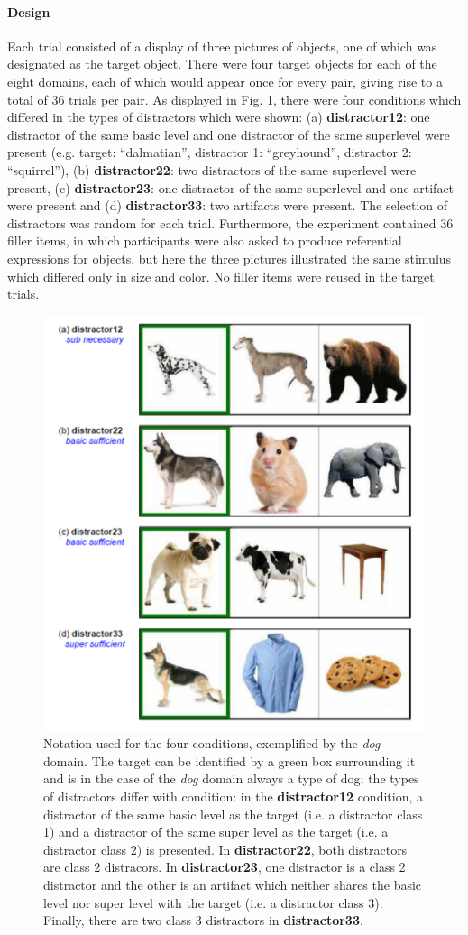 \documentclass[10pt,letterpaper]{article}
\begin{document}
\paragraph{\bf Design}
Each trial consisted of a display of three pictures of objects, one of which was designated as the target object. There were four target objects for each of the eight domains, each of which would appear once for every pair, giving rise to a total of 36 trials per pair. As displayed in Fig. 1, there were four conditions which differed in the types of distractors which were shown: (a) \textbf{distractor12}: one distractor of the same basic level and one distractor of the same superlevel were present (e.g. target: ``dalmatian'', distractor 1: ``greyhound'', distractor 2: ``squirrel''), (b) \textbf{distractor22}: two distractors of the same superlevel were present, (c) \textbf{distractor23}: one distractor of the same superlevel and one artifact were present and (d) \textbf{distractor33}: two artifacts were present. The selection of distractors was random for each trial. Furthermore, the experiment contained 36 filler items, in which participants were also asked to produce referential expressions for objects, but here the three pictures illustrated the same stimulus which differed only in size and color. No filler items were reused in the target trials.

\begin{figure}[ht!]
\centering
\includegraphics[width=.5\textwidth]{graphs/design}
\caption{Notation used for the four conditions, exemplified by the \textit{dog} domain. The target can be identified by a green box surrounding it and is in the case of the \textit{dog} domain always a type of dog; the types of distractors differ with condition: in the  \textbf{distractor12} condition, a distractor of the same basic level as the target (i.e. a distractor class 1) and a distractor of the same super level as the target (i.e. a distractor class 2) is presented. In \textbf{distractor22}, both distractors are class 2 distracors. In \textbf{distractor23}, one distractor is a class 2 distractor and the other is an artifact which neither shares the basic level nor super level with the target (i.e. a distractor class 3). Finally, there are two class 3 distractors in \textbf{distractor33}.}
\label{fig:design}
\end{figure}
\end{document}
